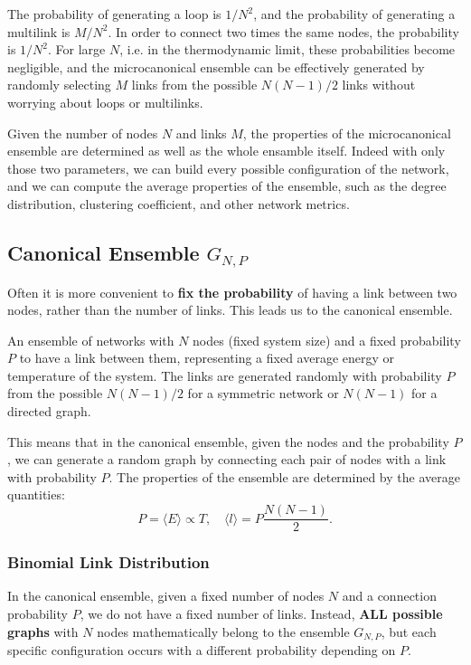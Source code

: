 The probability of generating a loop is $1/N^2$, and the probability of generating a multilink is $M/N^2$. In order to connect two times the same nodes, the probability is $1/N^2$. For large $N$, i.e. in the thermodynamic limit, these probabilities become negligible, and the microcanonical ensemble can be effectively generated by randomly selecting $M$ links from the possible $N(N-1)/2$ links without worrying about loops or multilinks.

Given the number of nodes \(N\) and links \(M\), the properties of the microcanonical ensemble are determined as well as the whole ensamble itself. Indeed with only those two parameters, we can build every possible configuration of the network, and we can compute the average properties of the ensemble, such as the degree distribution, clustering coefficient, and other network metrics.

\subsection{Canonical Ensemble $G_{N,P}$}

Often it is more convenient to \textbf{fix the probability} of having a link between two nodes, rather than the number of links. This leads us to the canonical ensemble.

\begin{definition}
    An ensemble of networks with $N$ nodes (fixed system size) and a fixed probability $P$ to have a link between them, representing a fixed average energy or temperature of the system. The links are generated randomly with probability $P$ from the possible $N(N-1)/2$ for a symmetric network or $N(N-1)$ for a directed graph.
\end{definition}

This means that in the canonical ensemble, given the nodes and the probability $P$, we can generate a random graph by connecting each pair of nodes with a link with probability $P$. The properties of the ensemble are determined by the average quantities:
\[
    P = \langle E \rangle \propto T, \quad \langle l \rangle = P \frac{N(N-1)}{2}.
\]

\subsubsection{Binomial Link Distribution}

In the canonical ensemble, given a fixed number of nodes \( N \) and a connection probability \( P \), we do not have a fixed number of links. Instead, \textbf{ALL possible graphs} with \( N \) nodes mathematically belong to the ensemble \( G_{N,P} \), but each specific configuration occurs with a different probability depending on \( P \).

